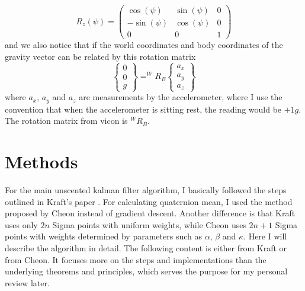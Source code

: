 \documentclass[twoside]{article}
\begin{document}
\begin{multicols}{2}
\begin{equation}
\end{equation}
\begin{equation}
R_z(\psi) = \left(\begin{array}{ccc} \cos\!\left(\psi{}\right) & \sin\!\left(\psi{}\right) & 0\\ - \sin\!\left(\psi{}\right) & \cos\!\left(\psi{}\right) & 0\\ 0 & 0 & 1 \end{array}\right)
\end{equation}
and we also notice that if the world coordinates and body coordinates of the gravity vector can be related by this rotation matrix
\begin{equation}
\begin{Bmatrix}0 \\ 0 \\ g\end{Bmatrix} = 
^WR_B \begin{Bmatrix}a_x \\ a_y \\ a_z\end{Bmatrix}
\end{equation}
where $a_x$, $a_y$ and $a_z$ are measurements by the accelerometer, where I use the convention that when the accelerometer is sitting rest, the reading would be $+1g$. The rotation matrix from vicon is $^WR_B$.


\section{Methods}
For the main unscented kalman filter algorithm, I basically followed the steps outlined in Kraft's paper \cite{Kraft03}. For calculating quaternion mean, I used the method proposed by Cheon \cite{Cheon07} instead of gradient descent. Another difference is that Kraft uses only $2n$ Sigma points with uniform weights, while Cheon uses $2n+1$ Sigma points with weights determined by parameters such as $\alpha$, $\beta$ and $\kappa$. Here I will describe the algorithm in detail. The following content is either from Kraft or from Cheon. It focuses more on the steps and implementations than the underlying theorems and principles, which serves the purpose for my personal review later.


\end{multicols}
\end{document}
